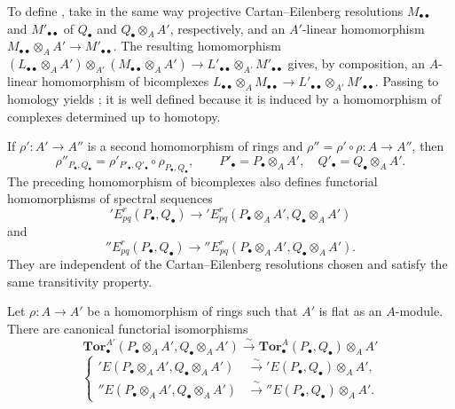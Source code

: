 \begin{env}[6.3.8]
To define , take in the same way projective
Cartan--Eilenberg resolutions $M_{\bullet\bullet}$ and
$M'_{\bullet\bullet}$ of $Q_\bullet$ and
$Q_\bullet\otimes_AA'$, respectively, and an $A'$-linear
homomorphism
$M_{\bullet\bullet}\otimes_AA'\longrightarrow M'_{\bullet\bullet}$.
The resulting homomorphism $(L_{\bullet\bullet}\otimes_A A')\otimes_{A'}
(M_{\bullet\bullet}\otimes_A A')
\to
L'_{\bullet\bullet}\otimes_{A'}M'_{\bullet\bullet}$
gives, by composition, an $A$-linear homomorphism of bicomplexes $L_{\bullet\bullet}\otimes_A M_{\bullet\bullet}
\to
L'_{\bullet\bullet}\otimes_{A'}M'_{\bullet\bullet}$.
Passing to homology yields ; it is well defined
because it is induced by a homomorphism of complexes determined up
to homotopy.

If $\rho':A'\longrightarrow A''$ is a second homomorphism of rings
and $\rho''=\rho'\circ\rho:A\longrightarrow A''$, then
\[
  \rho''_{P_\bullet,Q_\bullet}
  =
  \rho'_{P'_\bullet,Q'_\bullet}
  \circ
  \rho_{P_\bullet,Q_\bullet},
  \qquad
  P'_\bullet=P_\bullet\otimes_AA',
  \quad
  Q'_\bullet=Q_\bullet\otimes_AA'.
\]
The preceding homomorphism of bicomplexes also defines functorial
homomorphisms of spectral sequences
\[
  'E_{pq}^r(P_\bullet,Q_\bullet)
  \longrightarrow
  'E_{pq}^r(P_\bullet\otimes_AA',Q_\bullet\otimes_AA')
\]
and
\[
  ''E_{pq}^r(P_\bullet,Q_\bullet)
  \longrightarrow
  ''E_{pq}^r(P_\bullet\otimes_AA',Q_\bullet\otimes_AA').
\]
They are independent of the Cartan--Eilenberg resolutions chosen
and satisfy the same transitivity property.
\end{env}

\begin{proposition}[6.3.9]
\label{III.6.3.9}
Let $\rho:A\longrightarrow A'$ be a homomorphism of rings such that
$A'$ is \textup{flat} as an $A$-module.  There are canonical functorial
isomorphisms
\[
  \mathbf{Tor}_\bullet^{A'}
  (P_\bullet\otimes_AA',Q_\bullet\otimes_AA')
  \xrightarrow{\ \sim\ }
  \mathbf{Tor}_\bullet^A(P_\bullet,Q_\bullet)\otimes_AA'
  \tag{6.3.9.1}\label{III.6.3.9.1}
\]
\[
  \left\{
  \begin{aligned}
  'E(P_\bullet\otimes_AA',Q_\bullet\otimes_AA')
    &\xrightarrow{\ \sim\ }
      'E(P_\bullet,Q_\bullet)\otimes_AA',\\
  ''E(P_\bullet\otimes_AA',Q_\bullet\otimes_AA')
    &\xrightarrow{\ \sim\ }
      ''E(P_\bullet,Q_\bullet)\otimes_AA'.
  \end{aligned}
  \right.
  \tag{6.3.9.2}\label{III.6.3.9.2}
\]
\end{proposition}

